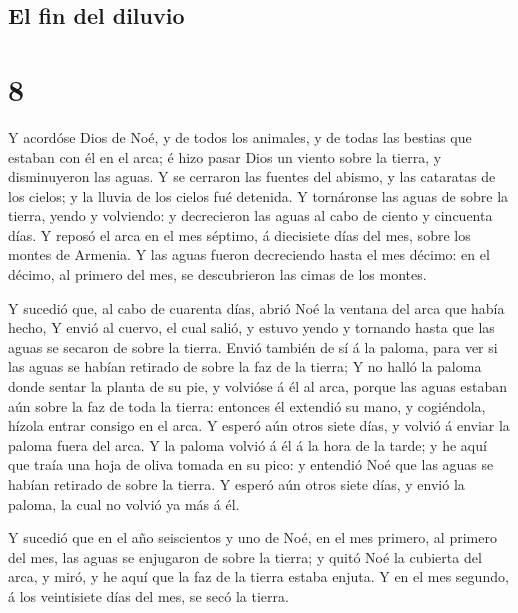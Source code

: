 \hypertarget{el-fin-del-diluvio}{%
\subsection{El fin del diluvio}\label{el-fin-del-diluvio}}

\hypertarget{section-7}{%
\section{8}\label{section-7}}

 Y acordóse Dios de Noé, y de todos los animales, y de todas
las bestias que estaban con él en el arca; é hizo pasar Dios un viento
sobre la tierra, y disminuyeron las aguas.  Y se cerraron
las fuentes del abismo, y las cataratas de los cielos; y la lluvia de
los cielos fué detenida.  Y tornáronse las aguas de sobre la
tierra, yendo y volviendo: y decrecieron las aguas al cabo de ciento y
cincuenta días.  Y reposó el arca en el mes séptimo, á
diecisiete días del mes, sobre los montes de Armenia.  Y las
aguas fueron decreciendo hasta el mes décimo: en el décimo, al primero
del mes, se descubrieron las cimas de los montes.

 Y sucedió que, al cabo de cuarenta días, abrió Noé la
ventana del arca que había hecho,  Y envió al cuervo, el
cual salió, y estuvo yendo y tornando hasta que las aguas se secaron de
sobre la tierra.  Envió también de sí á la paloma, para ver
si las aguas se habían retirado de sobre la faz de la tierra;
 Y no halló la paloma donde sentar la planta de su pie, y
volvióse á él al arca, porque las aguas estaban aún sobre la faz de toda
la tierra: entonces él extendió su mano, y cogiéndola, hízola entrar
consigo en el arca.  Y esperó aún otros siete días, y
volvió á enviar la paloma fuera del arca.  Y la paloma
volvió á él á la hora de la tarde; y he aquí que traía una hoja de oliva
tomada en su pico: y entendió Noé que las aguas se habían retirado de
sobre la tierra.  Y esperó aún otros siete días, y envió la
paloma, la cual no volvió ya más á él.

 Y sucedió que en el año seiscientos y uno de Noé, en el
mes primero, al primero del mes, las aguas se enjugaron de sobre la
tierra; y quitó Noé la cubierta del arca, y miró, y he aquí que la faz
de la tierra estaba enjuta.  Y en el mes segundo, á los
veintisiete días del mes, se secó la tierra.

